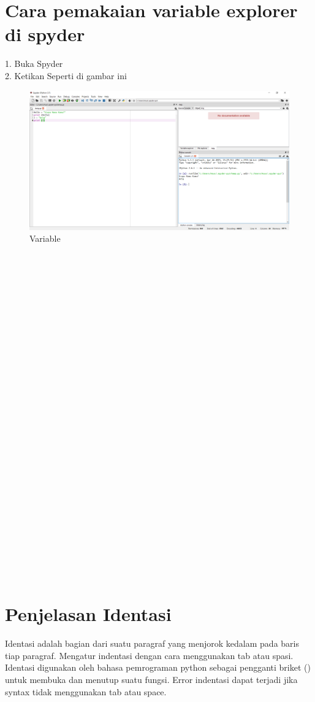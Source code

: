 \documentclass{article}
\begin{document}
\section{Cara pemakaian variable explorer di spyder}
1. Buka Spyder\\
2. Ketikan Seperti di gambar ini\\
\begin{figure}[h]
	\centering
		\includegraphics[scale=0.2]{Gambar/V1}
	\caption{Variable}
\end{figure}
\\
\\
\\
\\
\\
\\
\\
\\
\\
\\
\\
\\
\\
\\
\\
\\
\\
\\
\\
\\
\\
\\
\\
\\
\\
\\
\\
\section{Penjelasan Identasi}
Identasi adalah bagian dari suatu paragraf yang menjorok kedalam pada baris tiap paragraf. Mengatur indentasi dengan cara menggunakan tab atau spasi. Identasi digunakan oleh bahasa pemrograman python sebagai pengganti briket () untuk membuka dan menutup suatu fungsi. Error indentasi dapat terjadi jika syntax tidak menggunakan tab atau space.
\end{document}
